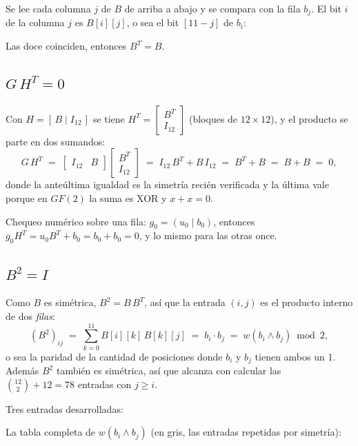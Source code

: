 \documentclass[11pt,a4paper]{article}
\begin{document}
Se lee cada columna $j$ de $B$ de arriba a abajo y se compara con la fila
$b_j$. El bit $i$ de la columna $j$ es $B[i][j]$, o sea el bit $[11-j]$ de
$b_i$:

\begin{center}\small

\end{center}

Las doce coinciden, entonces $B^{T}=B$.

\subsection{$G\,H^{T}=0$}

Con $H=[\,B\mid I_{12}\,]$ se tiene $H^{T}=\begin{bmatrix}B^{T}\\ I_{12}\end{bmatrix}$
(bloques de $12\times 12$), y el producto se parte en dos sumandos:
\[
  G\,H^{T}
  \;=\;
  \begin{bmatrix} I_{12} & B \end{bmatrix}
  \begin{bmatrix} B^{T} \\ I_{12} \end{bmatrix}
  \;=\; I_{12}\,B^{T} + B\,I_{12}
  \;=\; B^{T}+B
  \;=\; B+B \;=\; 0 ,
\]
donde la anteúltima igualdad es la simetría recién verificada y la última
vale porque en $GF(2)$ la suma es XOR y $x+x=0$.

Chequeo numérico sobre una fila: $g_0=(u_0\mid b_0)$, entonces
$g_0H^{T}=u_0B^{T}+b_0=b_0+b_0=0$, y lo mismo para las otras once.

\subsection{$B^{2}=I$}

Como $B$ es simétrica, $B^2=B\,B^{T}$, así que la entrada $(i,j)$ es el
producto interno de dos \emph{filas}:
\[
  (B^2)_{ij} \;=\; \sum_{k=0}^{11} B[i][k]\,B[k][j]
  \;=\; b_i\cdot b_j
  \;=\; w\!\left(b_i \wedge b_j\right) \bmod 2 ,
\]
o sea la paridad de la cantidad de posiciones donde $b_i$ y $b_j$ tienen
ambos un 1. Además $B^2$ también es simétrica, así que alcanza con calcular
las $\binom{12}{2}+12=78$ entradas con $j\ge i$.

Tres entradas desarrolladas:



La tabla completa de $w(b_i\wedge b_j)$ (en gris, las entradas repetidas por
simetría):
\end{document}
